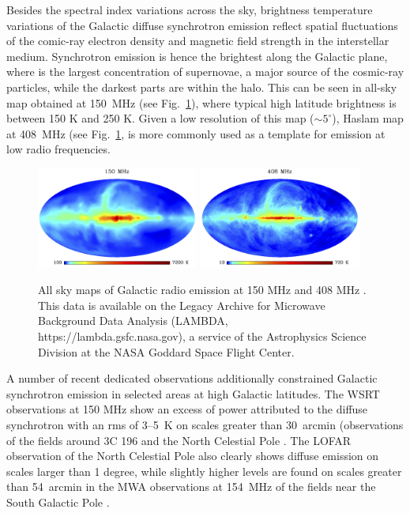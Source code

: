 Besides the spectral index variations across the sky, brightness temperature variations of the Galactic diffuse synchrotron emission reflect spatial fluctuations of the comic-ray electron density and magnetic field strength in the interstellar medium. Synchrotron emission is hence the brightest along the Galactic plane, where is the largest concentration of supernovae, a major source of the cosmic-ray particles, while the darkest parts are within the halo. This can be seen in \cite{landecker70} all-sky map obtained at 150~MHz (see Fig.~\ref{fig:GDSE}), where typical high latitude brightness is between 150 K and 250 K. Given a low resolution of this map ($\sim5^\circ$), Haslam map at 408~MHz (see Fig.~\ref{fig:GDSE}, \cite{haslam81,haslam82,remazeilles15} is more commonly used as a template for emission at low radio frequencies. 

\begin{figure}[!t]
\centering
    \includegraphics[width=0.475\textwidth]{Chapman_Jelic/Images/landecker.png}
    \includegraphics[width=0.475\textwidth]{Chapman_Jelic/Images/haslam.png}
    \caption{All sky maps of Galactic radio emission at 150 MHz \cite{landecker70} and 408 MHz \cite{haslam81, haslam82,remazeilles15}. This data is available on the Legacy Archive for Microwave Background Data Analysis (LAMBDA, https://lambda.gsfc.nasa.gov), a service of the Astrophysics Science Division at the NASA Goddard Space Flight Center.}
    \label{fig:GDSE} 
\end{figure}

A number of recent dedicated observations additionally constrained Galactic synchrotron emission in selected areas at high Galactic latitudes. The WSRT observations at 150 MHz show an excess of power attributed to the diffuse synchrotron with an rms of 3--5~K on scales greater than 30~arcmin (observations of the fields around 3C 196 and the North Celestial Pole \cite{bernardi10}. The LOFAR observation of the North Celestial Pole \cite{patil17} also clearly shows diffuse emission on scales larger than 1 degree, while slightly higher levels are found on scales greater than 54~arcmin in the MWA observations at 154~MHz of the fields near the South Galactic Pole \cite{lenc16}.

